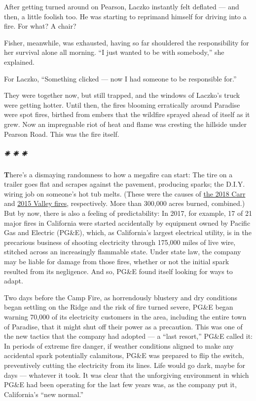 After getting turned around on Pearson, Laczko instantly felt deflated
--- and then, a little foolish too. He was starting to reprimand himself
for driving into a fire. For what? A chair?

Fisher, meanwhile, was exhausted, having so far shouldered the
responsibility for her survival alone all morning. ``I just wanted to be
with somebody,'' she explained.

For Laczko, ``Something clicked --- now I had someone to be responsible
for.''

They were together now, but still trapped, and the windows of Laczko's
truck were getting hotter. Until then, the fires blooming erratically
around Paradise were spot fires, birthed from embers that the wildfire
sprayed ahead of itself as it grew. Now an impregnable riot of heat and
flame was cresting the hillside under Pearson Road. This was the fire
itself.

\hypertarget{---4}{%
\subparagraph{❈ ❈ ❈}\label{---4}}

\textbf{T}here's a dismaying randomness to how a megafire can start: The
tire on a trailer goes flat and scrapes against the pavement, producing
sparks; the D.I.Y. wiring job on someone's hot tub melts. (These were
the causes of
\href{https://www.nytimes.com/2018/07/31/us/carr-fires-california-explained.html}{the
2018 Carr} and
\href{https://www.latimes.com/local/lanow/la-me-ln-napa-wildfire-hot-tub-20160810-snap-story.html}{2015
Valley fires}, respectively. More than 300,000 acres burned, combined.)
But by now, there is also a feeling of predictability: In 2017, for
example, 17 of 21 major fires in California were started accidentally by
equipment owned by Pacific Gas and Electric (PG\&E), which, as
California's largest electrical utility, is in the precarious business
of shooting electricity through 175,000 miles of live wire, stitched
across an increasingly flammable state. Under state law, the company may
be liable for damage from those fires, whether or not the initial spark
resulted from its negligence. And so, PG\&E found itself looking for
ways to adapt.

Two days before the Camp Fire, as horrendously blustery and dry
conditions began settling on the Ridge and the risk of fire turned
severe, PG\&E began warning 70,000 of its electricity customers in the
area, including the entire town of Paradise, that it might shut off
their power as a precaution. This was one of the new tactics that the
company had adopted --- a ``last resort,'' PG\&E called it: In periods
of extreme fire danger, if weather conditions aligned to make any
accidental spark potentially calamitous, PG\&E was prepared to flip the
switch, preventively cutting the electricity from its lines. Life would
go dark, maybe for days --- whatever it took. It was clear that the
unforgiving environment in which PG\&E had been operating for the last
few years was, as the company put it, California's ``new normal.''

